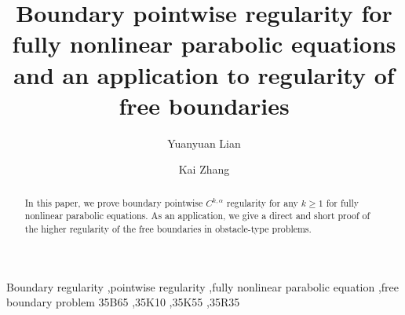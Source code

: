\documentclass[preprint,12pt]{elsarticle}
\theoremstyle{definition}
\theoremstyle{remark}
\numberwithin{equation}{section}
\begin{document}
\begin{frontmatter}

\title{Boundary pointwise regularity for fully nonlinear parabolic equations and an application to regularity of free boundaries}
\author[rvt]{Yuanyuan Lian}
%

\author[rvt]{Kai Zhang}
%
%
%
%
\address[rvt]{School of Mathematical Sciences, Shanghai Jiao Tong University, Shanghai, China}
%
%
%
%
%



\begin{abstract}
In this paper, we prove boundary pointwise $C^{k,\alpha}$ regularity for any $k\geq 1$ for fully nonlinear parabolic equations. As an application, we give a direct and short proof of the higher regularity of the free boundaries in obstacle-type problems.
\end{abstract}

\begin{keyword}
Boundary regularity \sep pointwise regularity \sep fully nonlinear parabolic equation \sep free boundary problem
\MSC[2020] 35B65 \sep 35K10 \sep 35K55 \sep 35R35
\end{keyword}
\end{frontmatter}


\end{document}
